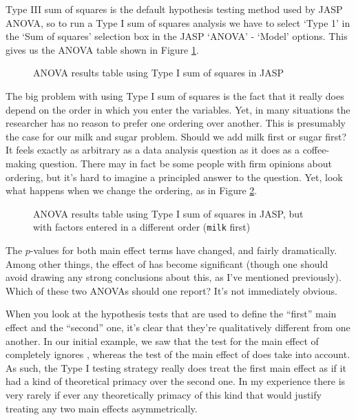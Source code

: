 Type III sum of squares is the default hypothesis testing method used by JASP ANOVA, so to run a Type I sum of squares analysis we have to select `Type 1' in the `Sum of squares' selection box in the JASP `ANOVA' - `Model' options. This gives us the ANOVA table shown in Figure \ref{fig:factorialanova16}.


\begin{figure}[!htb]
\begin{center}
\caption{ANOVA results table using Type I sum of squares in JASP}
\label{fig:factorialanova16}
\HR
\end{center}
\end{figure}

The big problem with using Type I sum of squares is the fact that it really does depend on the order in which you enter the variables. Yet, in many situations the researcher has no reason to prefer one ordering over another. This is presumably the case for our milk and sugar problem. Should we add milk first or sugar first? It feels exactly as arbitrary as a data analysis question as it does as a coffee-making question. There may in fact be some people with firm opinions about ordering, but it's hard to imagine a principled answer to the question. Yet, look what happens when we change the ordering, as in Figure \ref{fig:factorialanova17}.

\begin{figure}[!htb]
\begin{center}
\caption{ANOVA results table using Type I sum of squares in JASP, but with factors entered in a different order (\texttt{milk} first)}
\label{fig:factorialanova17}
\HR
\end{center}
\end{figure}

The $p$-values for both main effect terms have changed, and fairly dramatically. Among other things, the effect of  has become significant (though one should avoid drawing any strong conclusions about this, as I've mentioned previously). Which of these two ANOVAs should one report? It's not immediately obvious. 

When you look at the hypothesis tests that are used to define the ``first'' main effect and the ``second'' one, it's clear that they're qualitatively different from one another. In our initial example, we saw that the test for the main effect of  completely ignores , whereas the test of the main effect of  does take  into account. As such, the Type I testing strategy really does treat the first main effect as if it had a kind of theoretical primacy over the second one. In my experience there is very rarely if ever any theoretically primacy of this kind that would justify treating any two main effects asymmetrically. 

